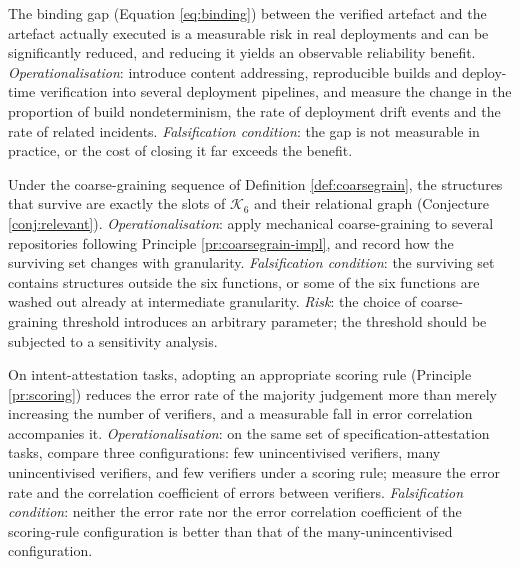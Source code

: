 \begin{hypothesis}\label{hyp:h9}
The binding gap (Equation \eqref{eq:binding}) between the verified artefact and the
artefact actually executed is a measurable risk in real deployments and can be
significantly reduced, and reducing it yields an observable reliability benefit.
\emph{Operationalisation}: introduce content addressing, reproducible builds and
deploy-time verification into several deployment pipelines, and measure the change in the
proportion of build nondeterminism, the rate of deployment drift events and the rate of
related incidents.
\emph{Falsification condition}: the gap is not measurable in practice, or the cost of
closing it far exceeds the benefit.
\end{hypothesis}

\begin{hypothesis}\label{hyp:h10}
Under the coarse-graining sequence of Definition \ref{def:coarsegrain}, the structures that
survive are exactly the slots of $\mathcal{K}_6$ and their relational graph (Conjecture
\ref{conj:relevant}).
\emph{Operationalisation}: apply mechanical coarse-graining to several repositories
following Principle \ref{pr:coarsegrain-impl}, and record how the surviving set changes
with granularity.
\emph{Falsification condition}: the surviving set contains structures outside the six
functions, or some of the six functions are washed out already at intermediate granularity.
\emph{Risk}: the choice of coarse-graining threshold introduces an arbitrary parameter; the
threshold should be subjected to a sensitivity analysis.
\end{hypothesis}

\begin{hypothesis}\label{hyp:h11}
On intent-attestation tasks, adopting an appropriate scoring rule (Principle
\ref{pr:scoring}) reduces the error rate of the majority judgement more than merely
increasing the number of verifiers, and a measurable fall in error correlation accompanies
it.
\emph{Operationalisation}: on the same set of specification-attestation tasks, compare
three configurations: few unincentivised verifiers, many unincentivised verifiers, and few
verifiers under a scoring rule; measure the error rate and the correlation coefficient of
errors between verifiers.
\emph{Falsification condition}: neither the error rate nor the error correlation
coefficient of the scoring-rule configuration is better than that of the
many-unincentivised configuration.
\end{hypothesis}

